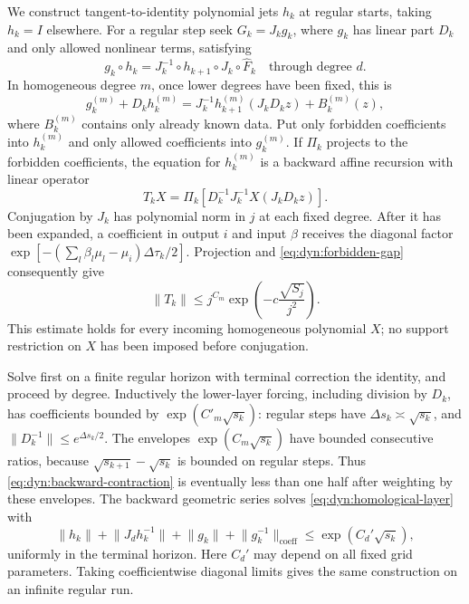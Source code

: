 \documentclass[11pt]{article}
\theoremstyle{definition}
\theoremstyle{remark}
\newcommand{\norm}[1]{\lVert#1\rVert}
\numberwithin{equation}{section}
\begin{document}
We construct tangent-to-identity polynomial jets $h_k$ at regular
starts, taking $h_k=I$ elsewhere.  For a regular step seek
$G_k=J_kg_k$, where $g_k$ has linear part $D_k$ and only allowed
nonlinear terms, satisfying
\begin{equation}
 g_k\circ h_k
 =J_k^{-1}\circ h_{k+1}\circ J_k\circ\widehat F_k
 \quad\text{through degree }d.
 \label{eq:dyn:homological-identity}
\end{equation}
In homogeneous degree $m$, once lower degrees have been fixed, this
is
\begin{equation}
 g_k^{(m)}+D_kh_k^{(m)}
 =J_k^{-1}h_{k+1}^{(m)}(J_kD_kz)+B_k^{(m)}(z),
 \label{eq:dyn:homological-layer}
\end{equation}
where $B_k^{(m)}$ contains only already known data.
Put only forbidden coefficients into $h_k^{(m)}$ and only allowed
coefficients into $g_k^{(m)}$.  If $\Pi_k$ projects to the forbidden
coefficients, the equation for $h_k^{(m)}$ is a backward affine
recursion with linear operator
\begin{equation}
 T_kX=\Pi_k\left[D_k^{-1}J_k^{-1}X(J_kD_kz)\right].
 \label{eq:dyn:backward-operator}
\end{equation}
Conjugation by $J_k$ has polynomial norm in $j$ at each fixed degree.
After it has been expanded, a coefficient in output $i$ and input
$\beta$ receives the diagonal factor
$\exp[-(\sum_l\beta_l\mu_l-\mu_i)\Delta\tau_k/2]$.
Projection and \eqref{eq:dyn:forbidden-gap} consequently give
\begin{equation}
 \norm{T_k}\le j^{C_m}
       \exp\left(-c\frac{\sqrt{S_j}}{j^2}\right).
 \label{eq:dyn:backward-contraction}
\end{equation}
This estimate holds for every incoming homogeneous polynomial $X$;
no support restriction on $X$ has been imposed before conjugation.

Solve first on a finite regular horizon with terminal correction the
identity, and proceed by degree.  Inductively the lower-layer forcing,
including division by $D_k$, has coefficients bounded by
$\exp(C'_m\sqrt{s_k})$: regular steps have
$\Delta s_k\asymp\sqrt{s_k}$, and
$\norm{D_k^{-1}}\le e^{\Delta s_k/2}$.
The envelopes $\exp(C_m\sqrt{s_k})$ have bounded consecutive ratios,
because $\sqrt{s_{k+1}}-\sqrt{s_k}$ is bounded on regular steps.
Thus \eqref{eq:dyn:backward-contraction} is eventually less than
one half after weighting by these envelopes.  The backward geometric
series solves \eqref{eq:dyn:homological-layer} with
\begin{equation}
 \norm{h_k}+\norm{J_dh_k^{-1}}+\norm{g_k}
       +\norm{g_k^{-1}}_{\mathrm{coeff}}
 \le\exp(C_d'\sqrt{s_k}),
 \label{eq:dyn:regular-coefficients}
\end{equation}
uniformly in the terminal horizon.  Here $C_d'$ may depend on all
fixed grid parameters.  Taking coefficientwise diagonal limits gives
the same construction on an infinite regular run.
\end{document}
